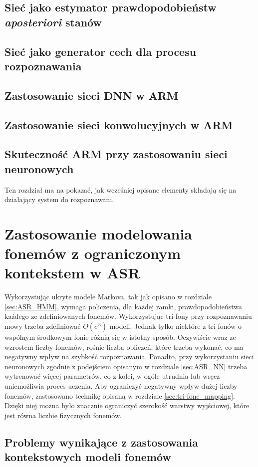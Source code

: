 \documentclass[11pt]{article}
\begin{document}
	\subsection{Sieć jako estymator prawdopodobieństw \textit{aposteriori} stanów }
	\subsection{Sieć jako generator cech dla procesu rozpoznawania }
	\subsection{Zastosowanie sieci DNN w ARM}
	\subsection{Zastosowanie sieci konwolucyjnych w ARM}
	\subsection{Skuteczność ARM przy zastosowaniu sieci neuronowych}
	
	Ten rozdział ma na pokazać, jak wcześniej opisane elementy składają się na działający system do rozpoznawani.

\section{ Zastosowanie modelowania fonemów z ograniczonym kontekstem w ASR }	
	Wykorzystując ukryte modele Markova, tak jak opisano w rozdziale \ref{sec:ASR_HMM}, wymaga policzenia, dla każdej ramki, prawdopodobieństwa każdego ze zdefiniowanych fonemów. Wykorzystując tri-fony przy rozpoznawaniu mowy trzeba zdefiniować $O(\sigma^3)$ modeli. Jednak tylko niektóre z tri-fonów o wspólnym środkowym fonie różnią się w istotny sposób. Oczywiście wraz ze wzrostem liczby fonemów, rośnie liczba obliczeń, które trzeba wykonać, co ma negatywny wpływ na szybkość rozpoznawania. Ponadto, przy wykorzystaniu sieci neuronowych zgodnie z podejściem opisanym w rozdziale \ref{sec:ASR_NN} trzeba wytrenować więcej parametrów, co z kolei, w ogóle utrudnia lub wręcz uniemożliwia proces uczenia. Aby ograniczyć negatywny wpływ dużej liczby fonemów, zastosowano technikę opisaną w rozdziale \ref{sec:tri-fone_mapping}. Dzięki niej można było znacznie ograniczyć szerokość warstwy wyjściowej, które jest równa liczbie fizycznych fonemów.
	
	\subsection{ Problemy wynikające z zastosowania kontekstowych modeli fonemów }
\end{document}
